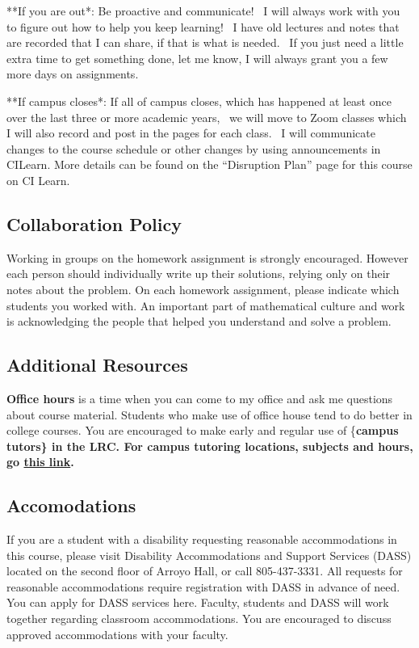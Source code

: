 \documentclass[
  letterpaper,
  DIV=11,
  numbers=noendperiod]{scrartcl}
\begin{document}
**If you are out*: Be proactive and communicate!~ I will always work
with you to figure out how to help you keep learning!~ I have old
lectures and notes that are recorded that I can share, if that is what
is needed.~ If you just need a little extra time to get something done,
let me know, I will always grant you a few more days on assignments.

**If campus closes*: If all of campus closes, which has happened at
least once over the last three or more academic years,~ we will move to
Zoom classes which I will also record and post in the pages for each
class.~ I will communicate changes to the course schedule or other
changes by using announcements in CILearn. More details can be found on
the ``Disruption Plan'' page for this course on CI Learn.

\subsection{Collaboration Policy}\label{collaboration-policy}

Working in groups on the homework assignment is strongly encouraged.
However each person should individually write up their solutions,
relying only on their notes about the problem. On each homework
assignment, please indicate which students you worked with. An important
part of mathematical culture and work is acknowledging the people that
helped you understand and solve a problem.

\subsection{Additional Resources}\label{additional-resources}

\textbf{Office hours} is a time when you can come to my office and ask
me questions about course material. Students who make use of office
house tend to do better in college courses. You are encouraged to make
early and regular use of \{\bf campus tutors\} in the LRC. For campus
tutoring locations, subjects and hours, go
\href{http://go.csuci.edu/tutoring}{this link}.

\subsection{Accomodations}\label{accomodations}

If you are a student with a disability requesting reasonable
accommodations in this course, please visit Disability Accommodations
and Support Services (DASS) located on the second floor of Arroyo Hall,
or call 805-437-3331. All requests for reasonable accommodations require
registration with DASS in advance of need. You can apply for DASS
services here. Faculty, students and DASS will work together regarding
classroom accommodations. You are encouraged to discuss approved
accommodations with your faculty.
\end{document}
